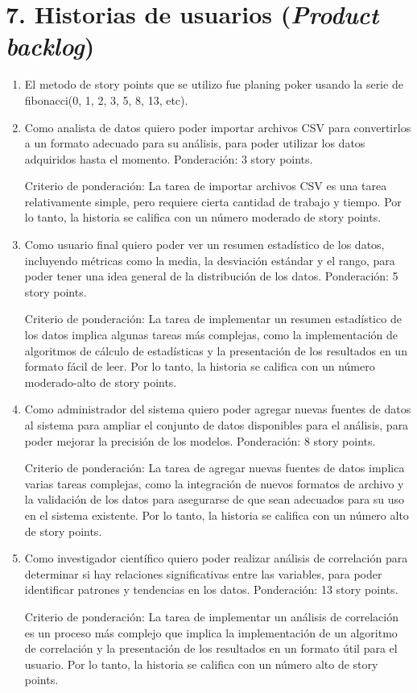 \documentclass[
11pt, %
codirector, %
]{charter}
\begin{document}
\section{7. Historias de usuarios (\textit{Product backlog})}
\label{sec:backlog}
\begin{enumerate}
\item El metodo de story points que se utilizo fue planing poker usando la serie de fibonacci(0, 1, 2, 3, 5, 8, 13, etc).

\item Como analista de datos quiero poder importar archivos CSV para convertirlos a un formato adecuado para su análisis, para poder utilizar los datos adquiridos hasta el momento. Ponderación: 3 story points.

Criterio de ponderación: La tarea de importar archivos CSV es una tarea relativamente simple, pero requiere cierta cantidad de trabajo y tiempo. Por lo tanto, la historia se califica con un número moderado de story points.

\item Como usuario final quiero poder ver un resumen estadístico de los datos, incluyendo métricas como la media, la desviación estándar y el rango, para poder tener una idea general de la distribución de los datos. Ponderación: 5 story points.

Criterio de ponderación: La tarea de implementar un resumen estadístico de los datos implica algunas tareas más complejas, como la implementación de algoritmos de cálculo de estadísticas y la presentación de los resultados en un formato fácil de leer. Por lo tanto, la historia se califica con un número moderado-alto de story points.

\item Como administrador del sistema quiero poder agregar nuevas fuentes de datos al sistema para ampliar el conjunto de datos disponibles para el análisis, para poder mejorar la precisión de los modelos. Ponderación: 8 story points.

Criterio de ponderación: La tarea de agregar nuevas fuentes de datos implica varias tareas complejas, como la integración de nuevos formatos de archivo y la validación de los datos para asegurarse de que sean adecuados para su uso en el sistema existente. Por lo tanto, la historia se califica con un número alto de story points.

\item Como investigador científico quiero poder realizar análisis de correlación para determinar si hay relaciones significativas entre las variables, para poder identificar patrones y tendencias en los datos. Ponderación: 13 story points.

Criterio de ponderación: La tarea de implementar un análisis de correlación es un proceso más complejo que implica la implementación de un algoritmo de correlación y la presentación de los resultados en un formato útil para el usuario. Por lo tanto, la historia se califica con un número alto de story points.
\end{enumerate}
\end{document}
